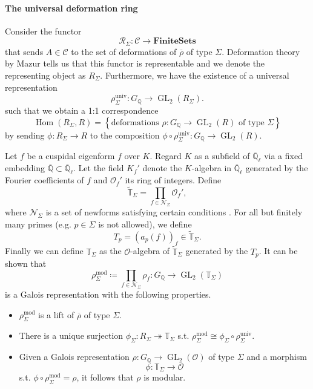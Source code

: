 \documentclass{article}
\theoremstyle{plain}%
\theoremstyle{definition}
\theoremstyle{remark}
\renewcommand{\hom}{\operatorname{Hom}}
\newcommand{\GL}{\operatorname{GL}}
\begin{document}
\paragraph{The universal deformation ring}
Consider the functor
\[
    \mathcal{R}_\Sigma \colon \mathcal{C} \to \mathrm{\mathbf{FiniteSets}}  
\]
that sends \(A \in \mathcal{C}\) to the set of deformations of \(\overline{\rho}\) of type \(\Sigma\).
Deformation theory by Mazur tells us that this functor is representable and we 
denote the representing object as \(R_\Sigma\).
Furthermore, we have the existence of a universal representation
\[ 
    \rho_\Sigma^\mathrm{univ}\colon G_\mathbb{Q} \to \GL_2(R_\Sigma).
\]
such that we obtain a 1:1 correspondence
\[
    \hom(R_\Sigma, R) = \left\{\text{deformations } \rho \colon G_\mathbb{Q} \to \GL_2(R) \text{ of type }\Sigma\right\}  
\]
by sending \(\phi \colon R_\Sigma \to R\) to the composition
\(\phi \circ \rho_\Sigma^\mathrm{univ}\colon G_\mathbb{Q} \to \GL_2(R)\).

Let \(f\) be a cuspidal eigenform \(f\) over \(K\). Regard \(K\) as a subfield of \(\overline{\mathbb{Q}}_\ell\) 
via a fixed embedding \(\overline{\mathbb{Q}} \subset \overline{\mathbb{Q}}_\ell\).
Let the field \(K_f'\) denote the \(K\)-algebra in \(\overline{\mathbb{Q}}_\ell\) generated by
the Fourier coefficients of \(f\) and \(\mathcal{O}_f'\) its ring of integers.
Define
\[
    \tilde{\mathbb{T}}_\Sigma = \prod_{f \in \mathcal{N}_\Sigma} \mathcal{O}_f',
\]
where \(\mathcal{N}_\Sigma\) is a set of newforms satisfying certain conditions \cite[see][lemma 3.26]{Darmon1995}.
For all but finitely many primes (e.g. \(p \in \Sigma\) is not allowed), we define
\[
    T_p = (a_p(f))_{f} \in \tilde{\mathbb{T}}_\Sigma.
\]
Finally we can define \(\mathbb{T}_\Sigma\) as the \(\mathcal{O}\)-algebra of \(\tilde{\mathbb{T}}_\Sigma\)
generated by the \(T_p\).
It can be shown \cite[cf.][lemma 3.27]{Darmon1995} that
\[
    \rho_\Sigma^\mathrm{mod} \coloneqq \prod_{f\in \mathcal{N}_\Sigma} \rho_f \colon G_\mathbb{Q} \to \GL_2(\mathbb{T}_\Sigma)
\]
is a Galois representation with the following properties.
\begin{itemize}
    \item \(\rho_\Sigma^\mathrm{mod}\) is a lift of \(\overline{\rho}\) of type \(\Sigma\).
    \item There is a unique surjection \(\phi_\Sigma\colon R_\Sigma \twoheadrightarrow \mathbb{T}_\Sigma\) 
    s.t. \(\rho_\Sigma^\mathrm{mod} \cong \phi_\Sigma \circ \rho_\Sigma^\mathrm{univ}\).
    \item Given a Galois representation \(\rho\colon G_\mathbb{Q} \to \GL_2(\mathcal{O})\) of type \(\Sigma\) and a morphism 
    \[
        \phi \colon \mathbb{T}_\Sigma \to \mathcal{O}
    \]
    s.t. \(\phi \circ \rho^{\mathrm{mod}}_{\Sigma} = \rho\), it follows that \(\rho\) is modular.
\end{itemize}
\end{document}

